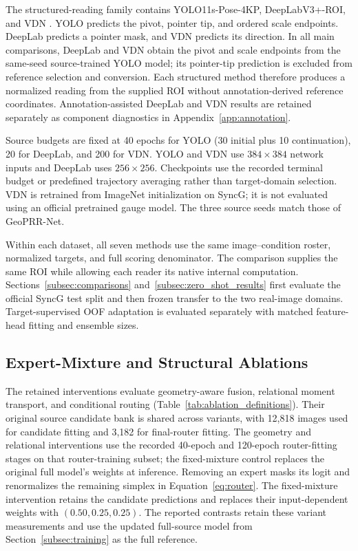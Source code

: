 \documentclass[electronics,article,submit,oneauthor]{Definitions/mdpi}
\newcommand{\modelname}{GeoPRR-Net\xspace}
\begin{document}
The structured-reading family contains YOLO11s-Pose-4KP, DeepLabV3+-ROI, and VDN \cite{jocher2023ultralytics,chen2018deeplabv3plus,dong2021vdn}. YOLO predicts the pivot, pointer tip, and ordered scale endpoints. DeepLab predicts a pointer mask, and VDN predicts its direction. In all main comparisons, DeepLab and VDN obtain the pivot and scale endpoints from the same-seed source-trained YOLO model; its pointer-tip prediction is excluded from reference selection and conversion. Each structured method therefore produces a normalized reading from the supplied ROI without annotation-derived reference coordinates. Annotation-assisted DeepLab and VDN results are retained separately as component diagnostics in Appendix~\ref{app:annotation}.

Source budgets are fixed at 40 epochs for YOLO (30 initial plus 10 continuation), 20 for DeepLab, and 200 for VDN. YOLO and VDN use $384\times384$ network inputs and DeepLab uses $256\times256$. Checkpoints use the recorded terminal budget or predefined trajectory averaging rather than target-domain selection. VDN is retrained from ImageNet initialization on SyncG; it is not evaluated using an official pretrained gauge model. The three source seeds match those of \modelname.

Within each dataset, all seven methods use the same image--condition roster, normalized targets, and full scoring denominator. The comparison supplies the same ROI while allowing each reader its native internal computation. Sections~\ref{subsec:comparisons} and~\ref{subsec:zero_shot_results} first evaluate the official SyncG test split and then frozen transfer to the two real-image domains. Target-supervised OOF adaptation is evaluated separately with matched feature-head fitting and ensemble sizes.

\subsection{Expert-Mixture and Structural Ablations}
\label{subsec:ablation_protocol}

The retained interventions evaluate geometry-aware fusion, relational moment transport, and conditional routing (Table~\ref{tab:ablation_definitions}). Their original source candidate bank is shared across variants, with 12,818 images used for candidate fitting and 3,182 for final-router fitting. The geometry and relational interventions use the recorded 40-epoch and 120-epoch router-fitting stages on that router-training subset; the fixed-mixture control replaces the original full model's weights at inference. Removing an expert masks its logit and renormalizes the remaining simplex in Equation~\eqref{eq:router}. The fixed-mixture intervention retains the candidate predictions and replaces their input-dependent weights with $(0.50,0.25,0.25)$. The reported contrasts retain these variant measurements and use the updated full-source model from Section~\ref{subsec:training} as the full reference.
\end{document}
